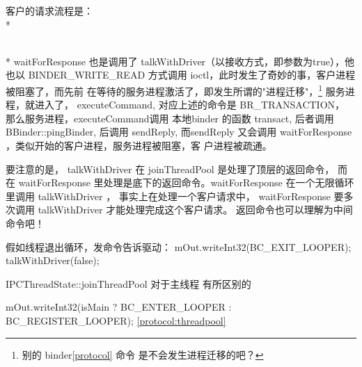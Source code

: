 \documentclass[a4paper,11pt]{article}
\begin{document}
客户的请求流程是：\\*
\\*
waitForResponse 也是调用了 talkWithDriver（以接收方式，即参数为true），他也以
BINDER_WRITE_READ 方式调用 ioctl，此时发生了奇妙的事，客户进程被阻塞了，而先前
在等待的服务进程激活了，即发生所谓的"进程迁移"，\footnote{ 别的
binder\autoref{protocol} 命令 是不会发生进程迁移的吧？} 服务进程，就进入了，
executeCommand, 对应上述的命令是 BR_TRANSACTION， 那么服务进程，executeCommand调用
本地binder 的函数 transact, 后者调用 BBinder::pingBinder,  后调用 sendReply,
而sendReply 又会调用 waitForResponse ，类似开始的客户进程，服务进程被阻塞，客
户进程被疏通。

要注意的是， talkWithDriver 在 joinThreadPool 是处理了顶层的返回命令， 而在
waitForResponse 里处理是底下的返回命令。waitForResponse 在一个无限循环里调用
talkWithDriver ， 事实上在处理一个客户请求中， waitForResponse 要多次调用
talkWithDriver 才能处理完成这个客户请求。 返回命令也可以理解为中间命令吧！

假如线程退出循环，发命令告诉驱动：
    mOut.writeInt32(BC_EXIT_LOOPER);
    talkWithDriver(false);




IPCThreadState::joinThreadPool 对于主线程 有所区别的

 mOut.writeInt32(isMain ? BC_ENTER_LOOPER : BC_REGISTER_LOOPER);
\autoref{protocol:threadpool}
\end{document}
